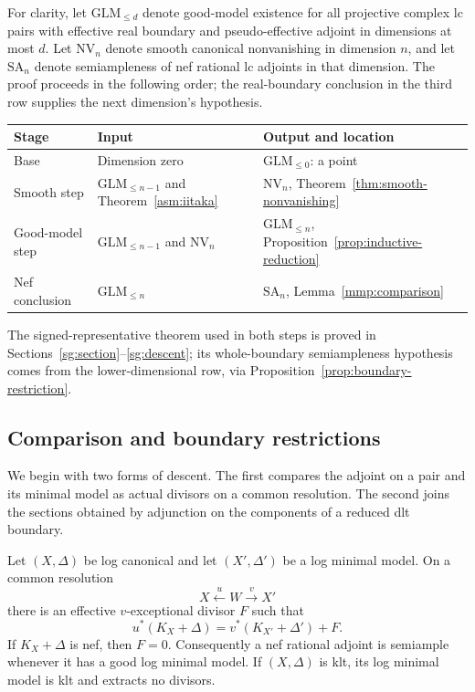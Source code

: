 For clarity, let \(\mathrm{GLM}_{\le d}\) denote good-model existence
for all projective complex lc pairs with effective real boundary and
pseudo-effective adjoint in dimensions at most \(d\). Let
\(\mathrm{NV}_n\) denote smooth canonical nonvanishing in dimension
\(n\), and let \(\mathrm{SA}_n\) denote semiampleness of nef rational
lc adjoints in that dimension. The proof proceeds in the following
order; the real-boundary conclusion in the third row supplies the next
dimension's hypothesis.
\begin{center}
\small
\begin{tabular}{@{}p{}p{}p{}@{}}
\toprule
Stage & Input & Output and location \\
\midrule
Base & Dimension zero & \(\mathrm{GLM}_{\le0}\): a point \\
Smooth step & \(\mathrm{GLM}_{\le n-1}\) and
Theorem~\ref{asm:iitaka} & \(\mathrm{NV}_n\),
Theorem~\ref{thm:smooth-nonvanishing} \\
Good-model step & \(\mathrm{GLM}_{\le n-1}\) and \(\mathrm{NV}_n\)
& \(\mathrm{GLM}_{\le n}\),
Proposition~\ref{prop:inductive-reduction} \\
Nef conclusion & \(\mathrm{GLM}_{\le n}\) & \(\mathrm{SA}_n\),
Lemma~\ref{mmp:comparison} \\
\bottomrule
\end{tabular}
\end{center}
The signed-representative theorem used in both steps is proved in
Sections~\ref{sg:section}--\ref{sg:descent}; its whole-boundary
semiampleness hypothesis comes from the lower-dimensional row,
via Proposition~\ref{prop:boundary-restriction}.

\subsection{Comparison and boundary restrictions}

We begin with two forms of descent. The first compares the adjoint on
a pair and its minimal model as actual divisors on a common resolution.
The second joins the sections obtained by adjunction on the components
of a reduced dlt boundary.

\begin{lemma}\label{mmp:comparison}
Let \((X,\Delta)\) be log canonical and let \((X',\Delta')\)
be a log minimal model. On a common resolution
\[
 X \xleftarrow{u} W \xrightarrow{v} X'
\]
there is an effective \(v\)-exceptional divisor \(F\) such that
\begin{equation}\label{mmp:comparison-equation}
 u^*(K_X+\Delta)=v^*(K_{X'}+\Delta')+F.
\end{equation}
If \(K_X+\Delta\) is nef, then \(F=0\). Consequently a nef
rational adjoint is semiample whenever it has a good log minimal
model. If \((X,\Delta)\) is klt, its log minimal model is klt and
extracts no divisors.
\end{lemma}


